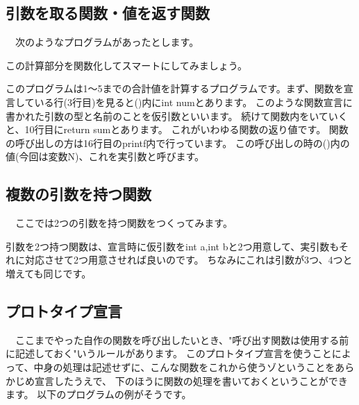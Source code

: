 \subsection{引数を取る関数・値を返す関数}
　次のようなプログラムがあったとします。

この計算部分を関数化してスマートにしてみましょう。



このプログラムは1～5までの合計値を計算するプログラムです。まず、関数を宣言している行(3行目)を見ると()内にint numとあります。
このような関数宣言に書かれた引数の型と名前のことを仮引数といいます。
続けて関数内をいていくと、10行目にreturn sumとあります。
これがいわゆる関数の返り値です。
関数の呼び出しの方は16行目のprintf内で行っています。
この呼び出しの時の()内の値(今回は変数N)、これを実引数と呼びます。

\subsection{複数の引数を持つ関数}
　ここでは2つの引数を持つ関数をつくってみます。



引数を2つ持つ関数は、宣言時に仮引数をint a,int bと2つ用意して、実引数もそれに対応させて2つ用意させれば良いのです。
ちなみにこれは引数が3つ、4つと増えても同じです。

\subsection{プロトタイプ宣言}
　ここまでやった自作の関数を呼び出したいとき、"呼び出す関数は使用する前に記述しておく"いうルールがあります。
このプロトタイプ宣言を使うことによって、中身の処理は記述せずに、こんな関数をこれから使うゾということをあらかじめ宣言したうえで、
下のほうに関数の処理を書いておくということができます。
以下のプログラムの例がそうです。









